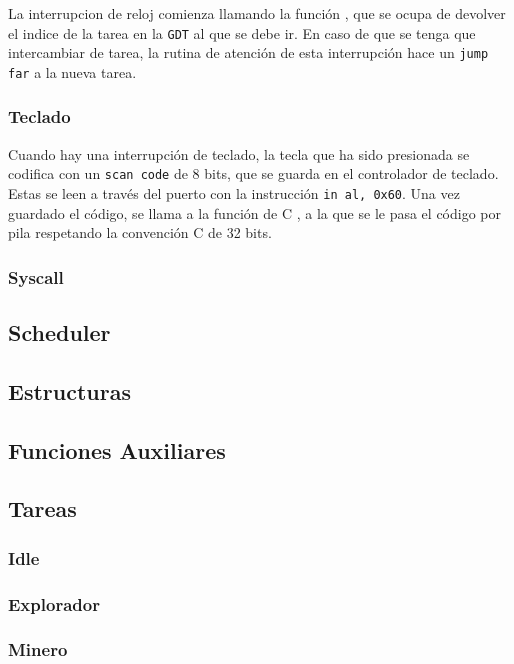 La interrupcion de reloj comienza llamando la función , que se ocupa de devolver el indice de la tarea en la \texttt{GDT} al que se debe ir. En caso de que se tenga que intercambiar de tarea, la rutina de atención de esta interrupción hace un \texttt{jump far} a la nueva tarea.

\subsubsection{Teclado}

Cuando hay una interrupción de teclado, la tecla que ha sido presionada se codifica con un \texttt{scan code} de 8 bits, que se guarda en el controlador de teclado. Estas se leen a través del puerto  con la instrucción \texttt{in al, 0x60}. Una vez guardado el código, se llama a la función de C , a la que se le pasa el código por pila respetando la convención C de 32 bits.

\subsubsection{Syscall}

\subsection{Scheduler}

\subsection{Estructuras}

\subsection{Funciones Auxiliares}

\subsection{Tareas}

\subsubsection{Idle}

\subsubsection{Explorador}

\subsubsection{Minero}
